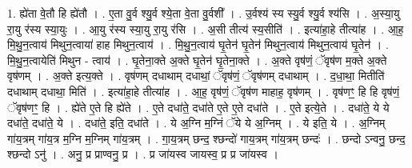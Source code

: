 \documentclass[17pt]{extarticle}
\begin{document}
1. ह्ये॑ता वे॒तौ हि ह्ये॑तौ । . ए॒ता वु॒र्व श्यु॒र्व श्ये॒ता वे॒ता वु॒र्वशी᳚ । . उ॒र्वश्य॑ स्य स्यु॒र्व श्यु॒र्व श्य॑सि । . अ॒स्या॒यु रा॒यु र॑स्य स्या॒युः । . आ॒यु र॑स्य स्या॒यु रा॒यु र॑सि । . अ॒सी तीत्य॑ स्य॒सीति॑ । . इत्या॑हा॒हे तीत्या॑ह । . आ॒ह॒ मि॒थु॒न॒त्वाय॑ मिथुन॒त्वाया॑ हाह मिथुन॒त्वाय॑ । . मि॒थु॒न॒त्वाय॑ घृ॒तेन॑ घृ॒तेन॑ मिथुन॒त्वाय॑ मिथुन॒त्वाय॑ घृ॒तेन॑ । . मि॒थु॒न॒त्वायेति॑ मिथुन - त्वाय॑ । . घृ॒तेना॒क्ते अ॒क्ते घृ॒तेन॑ घृ॒तेना॒क्ते । . अ॒क्ते वृष॑णं॒ ॅवृष॑ण म॒क्ते अ॒क्ते वृष॑णम् । . अ॒क्ते इत्य॒क्ते । . वृष॑णम् दधाथाम् दधाथां॒ ॅवृष॑णं॒ ॅवृष॑णम् दधाथाम् । . द॒धा॒था॒ मितीति॑ दधाथाम् दधाथा॒ मिति॑ । . इत्या॑हा॒हे तीत्या॑ह । . आ॒ह॒ वृष॑णं॒ ॅवृष॑ण माहाह॒ वृष॑णम् । . वृष॑णꣳ॒॒ हि हि वृष॑णं॒ ॅवृष॑णꣳ॒॒ हि । . ह्ये॑ते ए॒ते हि ह्ये॑ते । . ए॒ते दधा॑ते॒ दधा॑ते ए॒ते ए॒ते दधा॑ते । . ए॒ते इत्ये॒ते । . दधा॑ते॒ ये ये दधा॑ते॒ दधा॑ते॒ ये । . दधा॑ते॒ इति॒ दधा॑ते । . ये अ॒ग्नि म॒ग्निं ॅये ये अ॒ग्निम् । . ये इति॒ ये । . अ॒ग्निम् गा॑य॒त्रम् गा॑य॒त्र म॒ग्नि म॒ग्निम् गा॑य॒त्रम् । . गा॒य॒त्रम् छन्द॒ श्छन्दो॑ गाय॒त्रम् गा॑य॒त्रम् छन्दः॑ । . छन्दो ऽन्वनु॒ छन्द॒ श्छन्दो ऽनु॑ । . अनु॒ प्र प्राण्वनु॒ प्र । . प्र जा॑यस्व जायस्व॒ प्र प्र जा॑यस्व । \newline
\end{document}
